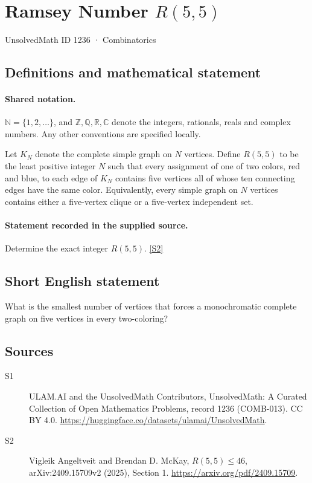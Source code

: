 \documentclass[11pt]{article}
\newcommand{\sref}[2]{\hyperlink{source:#1:#2}{[S#2]}}
\begin{document}
\setcounter{section}{1235}
\section{Ramsey Number $R(5,5)$}\label{1236}
{\small\sffamily UnsolvedMath ID 1236 · Combinatorics}
\subsection{Definitions and mathematical statement}

\paragraph{Shared notation.}$\mathbb N=\{1,2,\ldots\}$, and $\mathbb Z,\mathbb Q,\mathbb R,\mathbb C$ denote the integers, rationals, reals and complex numbers. Any other conventions are specified locally.


Let $K_N$ denote the complete simple graph on $N$ vertices. Define $R(5,5)$ to be the least positive integer $N$ such that every assignment of one of two colors, red and blue, to each edge of $K_N$ contains five vertices all of whose ten connecting edges have the same color. Equivalently, every simple graph on $N$ vertices contains either a five-vertex clique or a five-vertex independent set.
\paragraph{Statement recorded in the supplied source.}
Determine the exact integer $R(5,5)$. \sref{1236}{2}

\subsection{Short English statement}
What is the smallest number of vertices that forces a monochromatic complete graph on five vertices in every two-coloring?
\subsection{Sources}
\begin{description}
\item[\hypertarget{source:1236:1}{S1}] ULAM.AI and the UnsolvedMath Contributors, UnsolvedMath: A Curated Collection of Open Mathematics Problems, record 1236 (COMB-013). CC BY 4.0. \url{https://huggingface.co/datasets/ulamai/UnsolvedMath}.
\item[\hypertarget{source:1236:2}{S2}] Vigleik Angeltveit and Brendan D. McKay, \emph{$R(5,5)\leq46$}, arXiv:2409.15709v2 (2025), Section 1. \url{https://arxiv.org/pdf/2409.15709}.
\end{description}
\label{end:1236}
\end{document}
